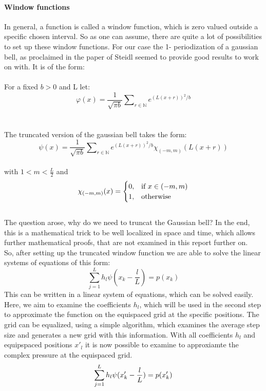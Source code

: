 \documentclass{article}
\begin{document}
\paragraph{Window functions	} $ $\\[1ex]
In general, a function is called a window function, which is zero valued outside a specific chosen interval. So as one can assume, there are quite a lot of possibilities to set up these window functions. For our case the 1- periodization of a gaussian bell, as proclaimed in the paper of Steidl seemed to provide good results to work on with. It is of the form: 
\\
\\
For a fixed $b>0$ and L let:
\begin{equation}
\varphi(x)= \frac{1}{\sqrt{\pi b}} \sum\nolimits_{r \in \mathbb{N}}  e^{(L(x+r))^2/b}
\end{equation}\\\\		
The truncated version of the gaussian bell takes the form: 
\begin{equation}
\psi(x)= \frac{1}{\sqrt{\pi b}} \sum\nolimits_{r \in \mathbb{N}}  e^{(L(x+r))^2/b}\chi_{(-m,m)}(L(x+r))
\end{equation}\\
with $1<m < \frac{L}{2}$ and
\begin{equation}
    \chi_{(-m,m)}(x)=
    \begin{cases}
      0, & \text{if}\ x\in (-m,m) \\
      1, & \text{otherwise}
    \end{cases}\notag
  \end{equation}\\ 
The question arose, why do we need to truncat the Gaussian bell? In the end, this is a mathematical trick to be well localized in space and time, which allows further mathematical proofs, that are not examined in this report further on. \\So, after setting up the truncated window function we are able to solve the linear systems of equations of this form:
\begin{equation}
\sum\limits_{j=1}^L h_{l}\psi(x_{k}-\frac{l}{L})=p(x_{k})
\end{equation}
This can be written in a linear system of equations, which can be solved easily. Here, we aim to examine the coefficients $h_{l}$, which will be used in the second step to approximate the function on the equispaced grid at the specific positions. The grid can be equalized, using a simple algorithm, which examines the average step size and generates a new grid with this information. With all coefficients $h_{l}$ and equipspaced positions $x'_{l}$ it is now possible to examine to approxiamte the complex pressure at the equispaced grid. 
\begin{equation}
 \sum\limits_{j=1}^L h_{l}\psi(x'_{k}-\frac{l}{L})=p(x'_{k})\notag
\end{equation}
\end{document}

